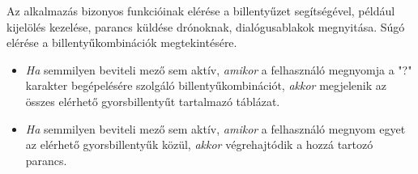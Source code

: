 Az alkalmazás bizonyos funkcióinak elérése a billentyűzet segítségével, például kijelölés kezelése, parancs küldése drónoknak, dialógusablakok megnyitása.
Súgó elérése a billentyűkombinációk megtekintésére.

\begin {itemize}
  \item \textit{Ha} semmilyen beviteli mező sem aktív, \textit{amikor} a felhasználó megnyomja a "?" karakter begépelésére szolgáló billentyűkombinációt, \textit{akkor} megjelenik az összes elérhető gyorsbillentyűt tartalmazó táblázat.
  \item \textit{Ha} semmilyen beviteli mező sem aktív, \textit{amikor} a felhasználó megnyom egyet az elérhető gyorsbillentyűk közül, \textit{akkor} végrehajtódik a hozzá tartozó parancs.
\end {itemize}
